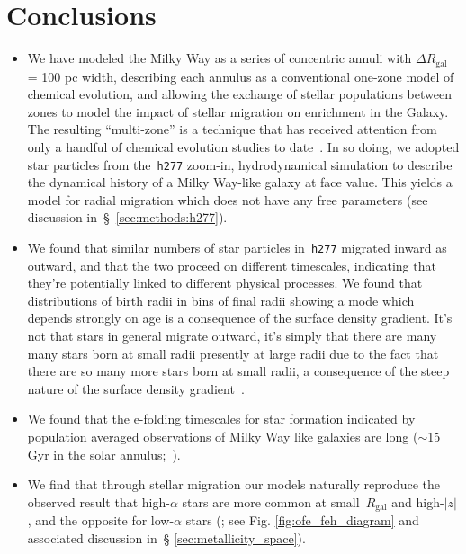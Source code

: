 \documentclass[fleqn, usenatbib]{mnras}
\begin{document}
\section{Conclusions} 
\label{sec:conclusions} 
\begin{itemize} 
	\item We have modeled the Milky Way as a series of concentric annuli with 
	$\Delta R_\text{gal}$ = 100 pc width, describing each annulus as a 
	conventional one-zone model of chemical evolution, and allowing the 
	exchange of stellar populations between zones to model the impact of 
	stellar migration on enrichment in the Galaxy. The resulting ``multi-zone'' 
	is a technique that has received attention from only a handful of 
	chemical evolution studies to date~\citep{Matteucci1989, 
	Schoenrich2009, Minchev2013, Sharma2020}. In so doing, we adopted star 
	particles from the~\texttt{h277} zoom-in, hydrodynamical simulation to 
	describe the dynamical history of a Milky Way-like galaxy at face value. 
	This yields a model for radial migration which does not have any free 
	parameters (see discussion in~\S~\ref{sec:methods:h277}). 

	\item We found that similar numbers of star particles in~\texttt{h277} 
	migrated inward as outward, and that the two proceed on different 
	timescales, indicating that they're potentially linked to different 
	physical processes. We found that distributions of birth radii in bins of 
	final radii showing a mode which depends strongly on age is a 
	consequence of the surface density gradient. It's not that stars in general 
	migrate outward, it's simply that there are many many stars born at small 
	radii presently at large radii due to the fact that there are so many more 
	stars born at small radii, a consequence of the steep nature of the 
	surface density gradient~\citep[e.g.][]{Bland-Hawthorn2016}. 

	\item We found that the e-folding timescales for star formation indicated 
	by population averaged observations of Milky Way like galaxies are long 
	($\sim$15 Gyr in the solar annulus;~\citealp{Sanchez2020}). 

	\item We find that through stellar migration our models naturally 
	reproduce the observed result that high-$\alpha$ stars are more common at 
	small~$R_\text{gal}$ and high-$\left|z\right|$, and the opposite for 
	low-$\alpha$ stars (\citealp{Hayden2015}; see Fig. 
	\ref{fig:ofe_feh_diagram} and associated discussion in~\S 
	\ref{sec:metallicity_space}). 


\end{itemize}
\end{document}
